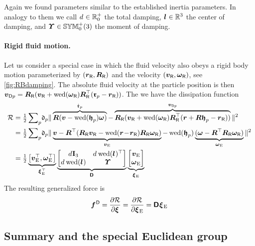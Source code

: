 Again we found parameters similar to the established inertia parameters.
In analogy to them we call $\bodyDamping{}{}\in\RealNumSP$ the total damping, $\bodyCOD{}{}\in\RealNum^3$ the center of damping, and $\bodyMOD{}{}\in\SymMatSP(3)$ the moment of damping.

\paragraph{Rigid fluid motion.}
Let us consider a special case in which the fluid velocity also obeys a rigid body motion parameterized by $(\boldsymbol{r}_{\mathsf{R}},\boldsymbol{R}_{\mathsf{R}})$ and the velocity $(\boldsymbol{v}_{\mathsf{R}},\boldsymbol{\omega}_{\mathsf{R}})$, see \autoref{fig:RBdamping}.
The absolute fluid velocity at the particle position is then $\boldsymbol{v}_{\mathsf{D}p} = \boldsymbol{R}_{\mathsf{R}}(\boldsymbol{v}_{\mathsf{R}} + \operatorname{wed}(\boldsymbol{\omega}_{\mathsf{R}})\boldsymbol{R}_{\mathsf{R}}^\top(\boldsymbol{\mathfrak{r}}_{p} - \boldsymbol{r}_{\mathsf{R}}))$.
The we have the dissipation function
\begin{align}\label{eq:RBDissFkt}
 \dissFkt &= \tfrac{1}{2} \sumParticles \!\particleDamping{\PidxI} \norm{\overbrace{\R(\v - \wedOp(\particleBodyPos{\PidxI})\w)}^{\particlePosd{\PidxI}} - \overbrace{\RR(\vR + \wedOp(\wR)\RR^\top(\r + \R\particleBodyPos{\PidxI} - \rR))}^{\tuple{v}_{\mathsf{D}\PidxI}}}^2
\nonumber\\
 &= \tfrac{1}{2} \sumParticles \!\particleDamping{\PidxI} \norm{\underbrace{\v - \R^\top(\RR\vR - \wedOp(\r \!-\! \rR)\RR\wR)}_{\vE} - \wedOp(\particleBodyPos{\PidxI})\underbrace{(\w - \R^\top\RR\wR)}_{\wE}}^2
\nonumber\\
 &= \tfrac{1}{2} 
 \underbrace{\big[ \vE^\top, \wE^\top \big]}_{\bodyVelE{}{}^\top }
 \underbrace{\begin{bmatrix} \bodyDamping{}{}\idMat[3] & \bodyDamping{}{} \wedOp(\bodyCOD{}{})^\top \\ \bodyDamping{}{} \wedOp(\bodyCOD{}{}) & \bodyMOD{}{} \end{bmatrix}}_{\bodyDissMat{}{}}
 \underbrace{\begin{bmatrix} \vE \\ \wE \end{bmatrix}}_{\bodyVelE{}{}}
\end{align}
The resulting generalized force is 
\begin{align}
 \bodyGenForceDiss{}{} = \pdiff[\dissFkt]{\bodyVel{}{}} = \pdiff[\dissFkt]{\bodyVelE{}{}} = \bodyDissMat{}{} \bodyVelE{}{}
\end{align}


\subsection{Summary and the special Euclidean group}\label{sec:RBSummary}

